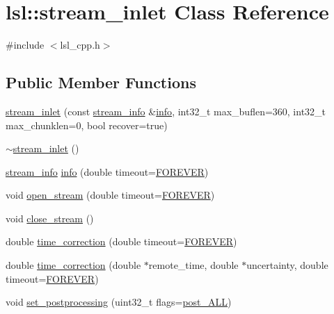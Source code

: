 \hypertarget{classlsl_1_1stream__inlet}{}\section{lsl\+:\+:stream\+\_\+inlet Class Reference}
\label{classlsl_1_1stream__inlet}


{\ttfamily \#include $<$lsl\+\_\+cpp.\+h$>$}

\subsection*{Public Member Functions}
\begin{DoxyCompactItemize}
\item 
\hyperlink{classlsl_1_1stream__inlet_a7c93b7d4fc053b2e3320841371b32919}{stream\+\_\+inlet} (const \hyperlink{classlsl_1_1stream__info}{stream\+\_\+info} \&\hyperlink{classlsl_1_1stream__inlet_ae895a8d5c10dc4072e969686fc402b5b}{info}, int32\+\_\+t max\+\_\+buflen=360, int32\+\_\+t max\+\_\+chunklen=0, bool recover=true)
\item 
\hyperlink{classlsl_1_1stream__inlet_ac3b37a1c2e376280c3144f422bb27d79}{$\sim$stream\+\_\+inlet} ()
\item 
\hyperlink{classlsl_1_1stream__info}{stream\+\_\+info} \hyperlink{classlsl_1_1stream__inlet_ae895a8d5c10dc4072e969686fc402b5b}{info} (double timeout=\hyperlink{namespacelsl_a74cfbc9077aca21295117217249721ed}{F\+O\+R\+E\+V\+ER})
\item 
void \hyperlink{classlsl_1_1stream__inlet_ad84029ed0662d755b0544c7652348718}{open\+\_\+stream} (double timeout=\hyperlink{namespacelsl_a74cfbc9077aca21295117217249721ed}{F\+O\+R\+E\+V\+ER})
\item 
void \hyperlink{classlsl_1_1stream__inlet_a77c2f10ed843723c7473aa52dcf544a0}{close\+\_\+stream} ()
\item 
double \hyperlink{classlsl_1_1stream__inlet_a845d95f5fc60fb9cd01fb73d3da75e94}{time\+\_\+correction} (double timeout=\hyperlink{namespacelsl_a74cfbc9077aca21295117217249721ed}{F\+O\+R\+E\+V\+ER})
\item 
double \hyperlink{classlsl_1_1stream__inlet_a9603f3365093f43f9e2bae1b9e9b2cd8}{time\+\_\+correction} (double $\ast$remote\+\_\+time, double $\ast$uncertainty, double timeout=\hyperlink{namespacelsl_a74cfbc9077aca21295117217249721ed}{F\+O\+R\+E\+V\+ER})
\item 
void \hyperlink{classlsl_1_1stream__inlet_aaf40ba9c127a1828933613d0f2b0fc3d}{set\+\_\+postprocessing} (uint32\+\_\+t flags=\hyperlink{namespacelsl_aaa1cffa7d29bb2756522bc2bb069e310a198f16659e71b850e4674ed31d10e914}{post\+\_\+\+A\+LL})

\end{DoxyCompactItemize}
